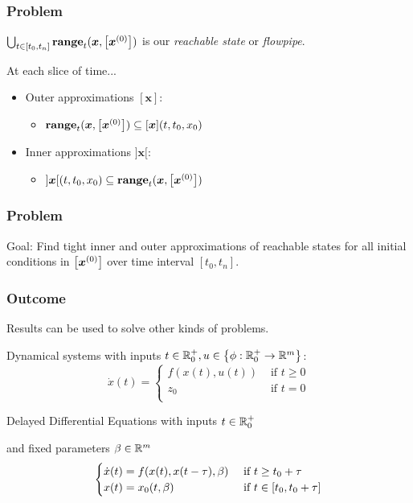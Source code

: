 \documentclass{beamer}
\newcommand{\intervalbox}[1]{\arr{\bm{x}^{(#1)}}}
\begin{document}
\begin{frame}
    \frametitle{Problem}

    $\bigcup_{t \in [t_0, t_n]} \range_t(\bm{x}, \intervalbox{0})$ is our \emph{reachable state} or \emph{flowpipe}.

    \vspace{7mm}
    At each slice of time...
    \begin{itemize}
        \item Outer approximations $[\bm{x}]$:
        \begin{itemize}
            \item $\range_t(\bm{x}, \intervalbox{0}) \subseteq [\bm{x}](t, t_0, x_0)$
        \end{itemize}
        \vspace{3mm}
        \item Inner approximations $]\bm{x}[$:
            \begin{itemize}
                \item $]\bm{x}[(t, t_0, x_0) \subseteq \range_t(\bm{x}, \intervalbox{0})$
            \end{itemize}
    \end{itemize}

\end{frame}


\begin{frame}
    \frametitle{Problem}

    Goal:
    Find tight inner and outer approximations of reachable states for all initial conditions in $\intervalbox{0}$ over time interval $[t_0, t_n]$.
\end{frame}

\begin{frame}
    \frametitle{Outcome}

    Results can be used to solve other kinds of problems.

    \vspace{5mm}
    Dynamical systems with inputs $t \in \mathbb R^+_0, u \in \left\{\phi : \mathbb R^+_0 \rightarrow \mathbb R^m\right\}$:
    $$\dot{x}(t) = \begin{cases} 
        f(x(t), u(t)) & \text{ if } t \geq 0\\
        z_0 & \text{ if } t = 0\\
    \end{cases}$$

    Delayed Differential Equations with inputs $t \in \mathbb R^+_0$
    \par and fixed parameters $\beta \in \mathbb R^m$
    $$\begin{cases}
        \dot{x}(t) = f(x(t), x(t-\tau), \beta) & \text{ if } t \geq t_0+\tau \\
            x(t) = x_0(t, \beta) & \text{ if } t \in [t_0, t_0+\tau] \\
    \end{cases}$$

\end{frame}
\end{document}
